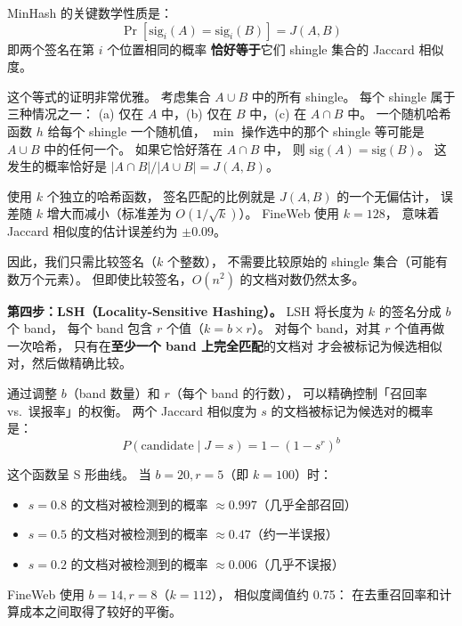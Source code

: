 MinHash 的关键数学性质是：
\begin{equation}
  \Pr[\text{sig}_i(A) = \text{sig}_i(B)] = J(A, B)
\end{equation}
即两个签名在第 $i$ 个位置相同的概率
\textbf{恰好等于}它们 shingle 集合的 Jaccard 相似度。

\begin{whybox}
这个等式的证明非常优雅。
考虑集合 $A \cup B$ 中的所有 shingle。
每个 shingle 属于三种情况之一：
(a) 仅在 $A$ 中，(b) 仅在 $B$ 中，(c) 在 $A \cap B$ 中。
一个随机哈希函数 $h$ 给每个 shingle 一个随机值，
$\min$ 操作选中的那个 shingle
等可能是 $A \cup B$ 中的任何一个。
如果它恰好落在 $A \cap B$ 中，
则 $\text{sig}(A) = \text{sig}(B)$。
这发生的概率恰好是 $|A \cap B| / |A \cup B| = J(A, B)$。

使用 $k$ 个独立的哈希函数，
签名匹配的比例就是 $J(A, B)$ 的一个无偏估计，
误差随 $k$ 增大而减小（标准差为 $O(1/\sqrt{k})$）。
FineWeb 使用 $k = 128$，
意味着 Jaccard 相似度的估计误差约为 $\pm 0.09$。
\end{whybox}

因此，我们只需比较签名（$k$ 个整数），
不需要比较原始的 shingle 集合（可能有数万个元素）。
但即使比较签名，$O(n^2)$ 的文档对数仍然太多。

\textbf{第四步：LSH（Locality-Sensitive Hashing）。}
LSH 将长度为 $k$ 的签名分成 $b$ 个 band，
每个 band 包含 $r$ 个值（$k = b \times r$）。
对每个 band，对其 $r$ 个值再做一次哈希，
只有在\textbf{至少一个 band 上完全匹配}的文档对
才会被标记为候选相似对，然后做精确比较。

通过调整 $b$（band 数量）和 $r$（每个 band 的行数），
可以精确控制「召回率 vs.\ 误报率」的权衡。
两个 Jaccard 相似度为 $s$ 的文档被标记为候选对的概率是：
\begin{equation}
  P(\text{candidate} \mid J = s) = 1 - (1 - s^r)^b
\end{equation}

这个函数呈 S 形曲线。
当 $b = 20, r = 5$（即 $k = 100$）时：
\begin{itemize}[noitemsep]
  \item $s = 0.8$ 的文档对被检测到的概率 $\approx 0.997$（几乎全部召回）
  \item $s = 0.5$ 的文档对被检测到的概率 $\approx 0.47$（约一半误报）
  \item $s = 0.2$ 的文档对被检测到的概率 $\approx 0.006$（几乎不误报）
\end{itemize}

FineWeb 使用 $b = 14, r = 8$（$k = 112$），
相似度阈值约 0.75：
在去重召回率和计算成本之间取得了较好的平衡。

